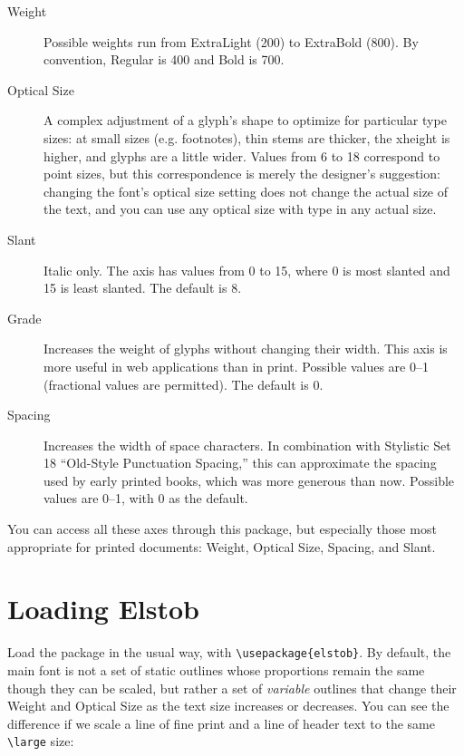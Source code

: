 \documentclass[12pt]{article}
\begin{document}
\begin{description}
    \item[Weight] Possible weights run from ExtraLight (200) to ExtraBold (800). By
    convention, Regular is 400 and Bold is 700.
    \item[Optical Size] A complex adjustment of a glyph's shape to
    optimize for particular type sizes: at small sizes (e.g. footnotes), thin stems are
    thicker, the xheight is higher, and glyphs are a little wider. Values from 6 to 18 correspond to point
    sizes, but this correspondence is merely the designer's suggestion: changing the
    font's optical size setting does not change the actual size of the text, and you can use any
    optical size with type in any actual size.
    \item[Slant] Italic only. The axis has values from 0 to 15, where 0 is {\mostslanted most
    slanted} and 15 is {\leastslanted least slanted}. The default is 8.
    \item[Grade] Increases the weight of glyphs without changing their width. This
    axis is more useful in web applications than in print.
    Possible values are 0–1 (fractional values are permitted). The default is 0.
    \item[Spacing] Increases the width of space characters. In combination with
    Stylistic Set 18 “Old-Style Punctuation Spacing,” this can approximate the
    spacing used by early printed books, which was more generous than now.
    Possible values are 0–1, with 0 as the default.
\end{description}

\noindent You can access all these axes through this package, but
especially those most appropriate for printed documents: Weight, Optical Size,
Spacing, and Slant.


\section{Loading Elstob}

Load the package in the usual way, with {\color{BrickRed}\verb|\usepackage{elstob}|}.
By default, the main font is not a set of static outlines whose proportions
remain the same though they can be scaled, but rather a set of
\emph{variable} outlines that change their Weight and Optical Size as the text size increases
or decreases. You can see the difference if we scale a line of fine print
and a line of header text to the same {\color{BrickRed}\verb|\large|} size:\\[0.5ex]
\end{document}
